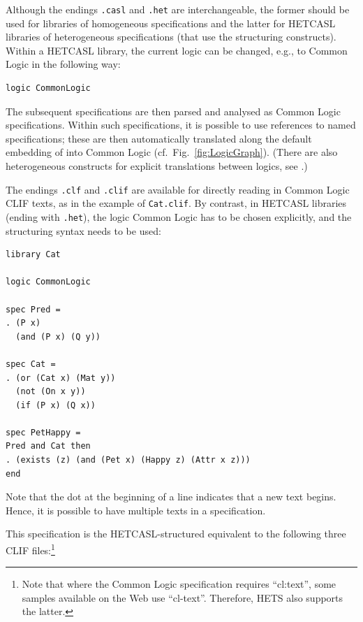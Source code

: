 \documentclass{article}
\newcommand{\normalTEXTSC}[2]{{#1\scriptsize#2}}
\newcommand     {\Hets}{\normalTEXTSC{H}{ETS}\xspace}
\newcommand{\HetCASL}{\normalTEXTSC{H}{ET}\normalTEXTSC{C}{ASL}\xspace}
\begin{document}
\medskip

Although the endings \texttt{.casl} and \texttt{.het} are
interchangeable, the former should be used for libraries of
homogeneous \CASL specifications and the latter for \HetCASL libraries
of heterogeneous specifications (that use the \CASL structuring
constructs). Within a \HetCASL library, the current logic can be changed, e.g.,
to Common Logic in the following way:

\begin{lstlisting}[morekeywords=logic]
logic CommonLogic
\end{lstlisting}

The subsequent specifications are then parsed and analysed as
Common Logic specifications. Within such specifications,
it is possible to use references to named \CASL specifications;
these are then automatically translated along the default
embedding of \CASL into Common Logic (cf.\ Fig.~\ref{fig:LogicGraph}).
(There are also heterogeneous constructs
for explicit translations between logics, see \cite{Mossakowski04}.)

The endings \texttt{.clf} and \texttt{.clif} are available for directly reading in
Common Logic CLIF texts, as in the example of \texttt{Cat.clif}.
By contrast, in \HetCASL libraries (ending with \texttt{.het}),
the logic Common Logic has to be chosen explicitly, and the \CASL structuring
syntax needs to be used:

\begin{lstlisting}[language=clif,morekeywords={library,logic,spec,then}]
library Cat

logic CommonLogic

spec Pred = 
. (P x)
  (and (P x) (Q y))

spec Cat =
. (or (Cat x) (Mat y))
  (not (On x y))
  (if (P x) (Q x))

spec PetHappy =
Pred and Cat then
. (exists (z) (and (Pet x) (Happy z) (Attr x z)))
end
\end{lstlisting}

Note that the dot at the beginning of a line indicates that a new text begins.
Hence, it is possible to have multiple texts in a \CASL specification.

This specification is the \HetCASL-structured equivalent to the following three
CLIF files:\footnote{Note that where the Common Logic specification requires ``cl:text'', some samples available on the Web use ``cl-text''. Therefore, \Hets also supports the latter.}\\
\end{document}
